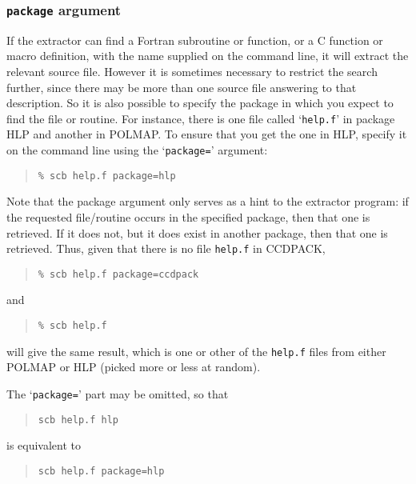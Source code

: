 \documentclass[twoside,11pt]{article}
\newcommand{\xlabel}[1]{}
\renewcommand{\_}{\texttt{\symbol{95}}}
\begin{document}
\subsubsection{\xlabel{sec:extract-package}\label{sec:extract-package}{\tt package} argument}

If the extractor can find a Fortran subroutine or function,
or a C function or macro definition, with the name supplied on
the command line, it will extract the relevant source file.
However it is sometimes necessary to restrict the search
further, since there may be more than one source file answering
to that description.  So it is also possible to specify the
package in which you expect to find the file or routine.
For instance, there is one file called `{\tt help.f}' in
package HLP and another in POLMAP.
To ensure that you get the one in HLP, specify it on the
command line using the `{\tt package=}' argument:
\begin{quote}
\begin{verbatim}
% scb help.f package=hlp
\end{verbatim}
\end{quote}
Note that the package argument only serves as a hint to the
extractor program: if the requested file/routine occurs in the
specified package, then that one is retrieved.  If it does not,
but it does exist in another package, then that one is retrieved.
Thus, given that there is no file {\tt help.f} in CCDPACK,
\begin{quote}
\begin{verbatim}
% scb help.f package=ccdpack
\end{verbatim}
\end{quote}
and
\begin{quote}
\begin{verbatim}
% scb help.f
\end{verbatim}
\end{quote}
will give the same result, which is one or other of the {\tt help.f}
files from either POLMAP or HLP (picked more or less at random).

The `{\tt package=}' part may be omitted, so that
\begin{quote}
\begin{verbatim}
scb help.f hlp
\end{verbatim}
\end{quote}
is equivalent to
\begin{quote}
\begin{verbatim}
scb help.f package=hlp
\end{verbatim}
\end{quote}
\end{document}
